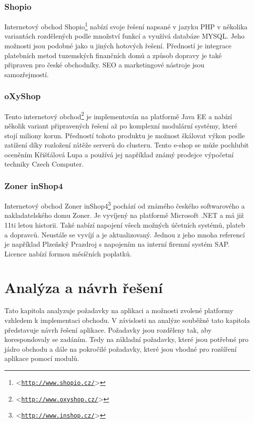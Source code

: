 \documentclass[11pt,twoside,a4paper]{book}
\let\oldUrl\url
\renewcommand\url[1]{<\texttt{\oldUrl{#1}}>}
\begin{document}
\subsection{Shopio}
Internetový obchod Shopio\footnote{\url{http://www.shopio.cz/}} nabízí svoje řešení napsané v jazyku PHP v několika variantách rozdělených podle množství funkcí a využívá databáze MYSQL. Jeho možnosti jsou podobné jako u jiných hotových řešení. Předností je integrace platebních metod tuzemských finančních domů a způsob dopravy je také připraven pro české obchodníky. SEO a marketingové nástroje jsou samozřejmostí.

\subsection{oXyShop}
Tento internetový obchod\footnote{\url{http://www.oxyshop.cz/}} je implementován na platformě Java EE a nabízí několik variant připravených řešení až po komplexní modulární systémy, které stojí miliony korun. Předností tohoto produktu je možnost škálovat výkon podle zatížení díky rozložení zátěže serverů do clusteru. Tento e-shop se může pochlubit oceněním Křišťálová Lupa a používá jej například známý prodejce výpočetní techniky Czech Computer.

\subsection{Zoner inShop4} 
Internetový obchod Zoner inShop4\footnote{\url{http://www.inshop.cz/}} pochází od známého českého softwarového a nakladatelského domu Zoner. Je vyvíjený na platformě Microsoft .NET a má již 11ti letou historii. Také nabízí napojení všech možných účetních systémů, plateb a dopravců. Neustále se vyvíjí a je aktualizovaný. Jednou z jeho mnoha referencí je například Plzeňský Prazdroj s napojením na interní firemní systém SAP. Licence nabízí formou měsíčních poplatků.




\chapter{Analýza a návrh řešení}
\label{sec:analyza}


Tato kapitola analyzuje požadavky na aplikaci a možnosti zvolené platformy vzhledem k implementaci obchodu. V závislosti na analýze souběžně tato kapitola představuje návrh řešení aplikace. Požadavky jsou rozděleny tak, aby korespondovaly se zadáním. Tedy na základní požadavky, které jsou potřebné pro jádro obchodu a dále na pokročilé požadavky, které jsou vhodné pro rozšíření aplikace pomocí modulů.
\end{document}
